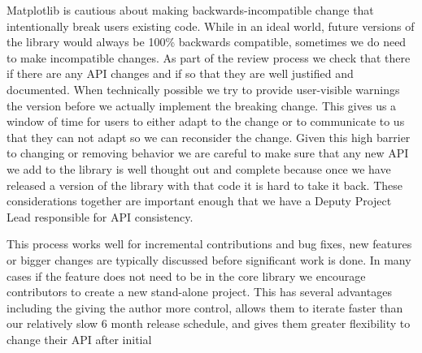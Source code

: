 \documentclass[12pt]{article}
\numberwithin{page}{section}
\begin{document}
Matplotlib is cautious about making backwards-incompatible change that
intentionally break users existing code.  While in an ideal world,
future versions of the library would always be 100\% backwards
compatible, sometimes we do need to make incompatible changes.  As
part of the review process we check that there if there are any API
changes and if so that they are well justified and documented.  When
technically possible we try to provide user-visible warnings the
version before we actually implement the breaking change.  This gives
us a window of time for users to either adapt to the change or to
communicate to us that they can not adapt so we can reconsider the
change.  Given this high barrier to changing or removing behavior we
are careful to make sure that any new API we add to the library is
well thought out and complete because once we have released a version
of the library with that code it is hard to take it back.  These
considerations together are important enough that we have a Deputy
Project Lead responsible for API consistency.

This process works well for incremental contributions and bug fixes,
new features or bigger changes are typically discussed before
significant work is done.  In many cases if the feature does not need
to be in the core library we encourage contributors to create a new
stand-alone project.  This has several advantages including the giving
the author more control, allows them to iterate faster than our
relatively slow 6 month release schedule, and gives them greater
flexibility to change their API after initial


\newpage

\def\ref@jnl#1{{\rm#1}}
\end{document}
